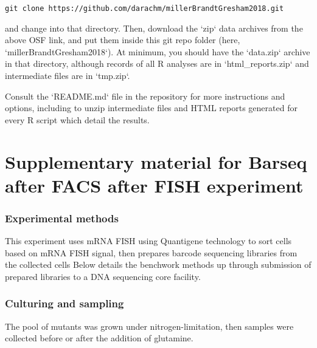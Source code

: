 {  \texttt{git clone https://github.com/darachm/millerBrandtGresham2018.git}
  
  \noindent and change into that directory.
  Then, download the `zip` data archives from the above
  OSF link, and put them inside this git repo folder 
  (here, `millerBrandtGresham2018`).
  At minimum, you should have the `data.zip` archive in that directory,
  although records of all R analyses are in `html\_reports.zip`
  and intermediate files are in `tmp.zip`.
  
  Consult the `README.md` file in the repository for more instructions
  and options, including to unzip intermediate files and HTML
  reports generated for every R script which detail the results.







\section{Supplementary material for Barseq after FACS after FISH
experiment}

\label{section:writeup4}

\subsubsection{Experimental methods}

This experiment uses mRNA FISH using Quantigene technology to sort cells
based on mRNA FISH signal, then prepares barcode sequencing libraries
from the collected cells Below details the benchwork methods up through
submission of prepared libraries to a DNA sequencing core facility.

\subsubsection{Culturing and sampling}

The pool of mutants was grown under nitrogen-limitation, then samples
were collected before or after the addition of glutamine.

}
